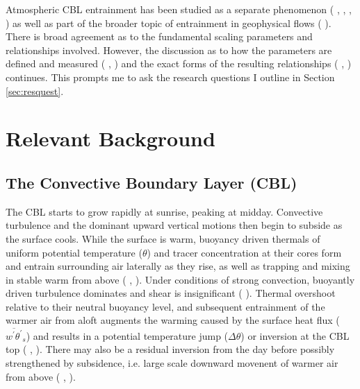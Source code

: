 Atmospheric \acs{CBL} entrainment has been studied as a separate phenomenon (\citeauthor{StullNelEl} \citeyear{StullNelEl}, \citeauthor{SullMoengStev} \citeyear{SullMoengStev}, \citeauthor{FedConzMir04} \citeyear{FedConzMir04}, \citeauthor{BrooksFowler2} \citeyear{BrooksFowler2}) as well as part of the broader topic of entrainment in geophysical flows (\citeauthor{Turner86} \citeyear{Turner86}). There is broad agreement as to the fundamental scaling parameters and relationships involved.  However, the discussion as to how the parameters are defined and measured (\citeauthor{BrooksFowler2} \citeyear{BrooksFowler2}, \citeauthor{Traum11} \citeyear{Traum11}) and the exact forms of the resulting relationships (\citeauthor{SullMoengStev} \citeyear{SullMoengStev}, \citeauthor{FedConzMir04} \citeyear{FedConzMir04} \citeauthor{BrooksFowler2} \citeyear{BrooksFowler2}) continues.  This prompts me to ask the research questions I outline in Section \ref{sec:resquest}.


\section{Relevant Background}
\label{sec:}
\subsection{The Convective Boundary Layer (CBL)}

The \acs{CBL} starts to grow rapidly at sunrise, peaking at midday.  Convective turbulence and the dominant upward vertical motions then begin to subside as the surface cools.  While the surface is warm, buoyancy driven thermals of uniform potential temperature ($\theta$) and tracer concentration at their cores form and entrain surrounding air laterally as they rise, as well as trapping and mixing in stable warm from above (\citeauthor{Stull-BLMetIntro} \citeyear{Stull-BLMetIntro}, \citeauthor{CrumStullEl} \citeyear{CrumStullEl}).  Under conditions of strong convection, buoyantly driven turbulence dominates and shear is insignificant (\citeauthor{DirLEddy} \citeyear{DirLEddy}). Thermal overshoot relative to their neutral buoyancy level, and subsequent entrainment of the warmer air from aloft augments the warming caused by the surface heat flux ($\overline{w^{'}\theta^{'}}_{s}$) and results in a potential temperature jump ($\Delta \theta$) or inversion at the \acs{CBL} top (\citeauthor{SchmidtSchu} \citeyear{SchmidtSchu}, \citeauthor{Turner86} \citeyear{Turner86}).  There may also be a residual inversion from the day before possibly strengthened by subsidence, i.e. large scale downward movenent of warmer air from above (\citeauthor{Stull-BLMetIntro} \citeyear{Stull-BLMetIntro}, \citeauthor{SullMoengStev} \citeyear{SullMoengStev}).\\  

